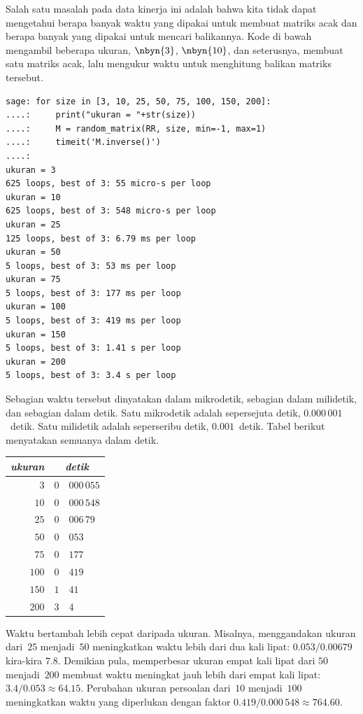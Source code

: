 Salah satu masalah pada data kinerja ini adalah bahwa
kita tidak dapat mengetahui berapa banyak waktu yang dipakai untuk membuat
matriks acak dan berapa banyak yang dipakai untuk mencari balikannya.
Kode di bawah mengambil beberapa ukuran, $\nbyn{3}$, $\nbyn{10}$, dan seterusnya,
membuat satu matriks acak, lalu mengukur waktu untuk menghitung
balikan matriks tersebut.
\begin{lstlisting}
sage: for size in [3, 10, 25, 50, 75, 100, 150, 200]:
....:     print("ukuran = "+str(size))
....:     M = random_matrix(RR, size, min=-1, max=1)
....:     timeit('M.inverse()')
....:     
ukuran = 3
625 loops, best of 3: 55 micro-s per loop
ukuran = 10
625 loops, best of 3: 548 micro-s per loop
ukuran = 25
125 loops, best of 3: 6.79 ms per loop
ukuran = 50
5 loops, best of 3: 53 ms per loop
ukuran = 75
5 loops, best of 3: 177 ms per loop
ukuran = 100
5 loops, best of 3: 419 ms per loop
ukuran = 150
5 loops, best of 3: 1.41 s per loop
ukuran = 200
5 loops, best of 3: 3.4 s per loop
\end{lstlisting}
Sebagian waktu tersebut dinyatakan dalam mikrodetik, sebagian dalam
milidetik, dan sebagian dalam detik.
Satu mikrodetik adalah sepersejuta detik,
$0.000\,001$~detik.
Satu milidetik adalah seperseribu detik,
$0.001$~detik.
Tabel berikut menyatakan semuanya dalam detik.
\begin{center}
  \begin{tabular}{r|r@{.}l}
    \multicolumn{1}{r}{\textit{ukuran}}     &\multicolumn{2}{c}{\textit{detik}}  \\  \hline
    $3$      &$0$ &$000\,055$ \\
    $10$     &$0$ &$000\,548$ \\
    $25$     &$0$ &$006\,79$ \\
    $50$     &$0$ &$053$ \\
    $75$     &$0$ &$177$ \\
    $100$    &$0$ &$419$ \\
    $150$    &$1$ &$41$ \\
    $200$    &$3$ &$4$ 
  \end{tabular}
\end{center}
Waktu bertambah lebih cepat daripada ukuran.
Misalnya, menggandakan ukuran dari~$25$ menjadi~$50$ meningkatkan waktu
lebih dari dua kali lipat: $0.053/0.00679$ kira-kira $7.8$.
Demikian pula, memperbesar ukuran empat kali lipat dari $50$ menjadi~$200$
membuat waktu meningkat jauh lebih dari empat kali lipat:
$3.4/0.053\approx 64.15$.
Perubahan ukuran persoalan dari~$10$ menjadi~$100$ meningkatkan waktu yang
diperlukan dengan faktor $0.419/0.000\,548\approx 764.60$.

